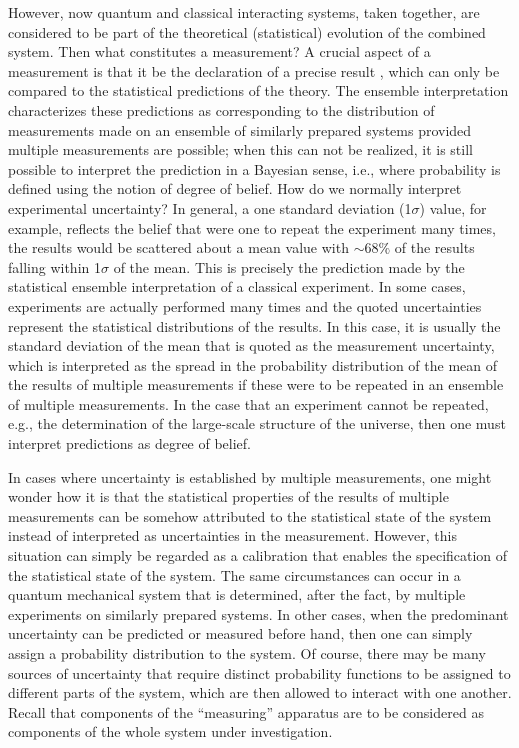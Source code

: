 \documentclass [12pt]{revtex4}
\begin{document}
However, now quantum and classical interacting systems, taken
together, are considered to be part of the theoretical (statistical)
evolution of the combined system. Then what constitutes a
measurement? A crucial aspect of a measurement is that it
be the declaration of a {precise} result \cite{precision}, which can only be compared
to the statistical predictions of the theory.  The ensemble
interpretation characterizes these predictions as corresponding to
the distribution of measurements made on an ensemble of similarly
prepared systems provided multiple measurements are possible; when this can not be realized, it is still possible to interpret the prediction in a
Bayesian sense, i.e., where probability is defined using the notion
of degree of belief.  How do we normally interpret experimental
uncertainty? In general, a one standard
deviation (1$\sigma$) value, for example, reflects the belief that
were one to repeat the experiment many times, the results would be
scattered about a mean value with $\sim 68 \%$ of the results
falling within 1$\sigma $ of the mean. This is precisely the
prediction made by the statistical ensemble interpretation of a
classical experiment. In some cases, experiments are actually
performed many times and the quoted uncertainties represent the
statistical distributions of the {results}. In this case, it
is usually the {standard deviation of the mean} that is
quoted as the measurement uncertainty, which is interpreted as the
spread in the probability distribution of the mean of the results of
multiple measurements if these were to be repeated in an ensemble
of multiple measurements.  In the case that an experiment cannot be
repeated, e.g., the determination of the large-scale structure of the
universe, then one must interpret predictions as degree of belief.

In cases where uncertainty is established by multiple measurements,
one might wonder how it is that the statistical properties of the
{results} of multiple measurements can be somehow attributed
to the statistical state of the system instead of interpreted as
uncertainties in the measurement. However, this situation can simply
be regarded as a {calibration} that enables the specification
of the statistical state of the system. The same circumstances can
occur in a quantum mechanical system that is determined, after the
fact, by multiple experiments on similarly prepared systems. In
other cases, when the predominant uncertainty can be
predicted or measured before hand, then one can simply assign a
probability distribution to the system. Of course, there may be many
sources of uncertainty that require distinct probability functions to be
assigned to different parts of the system, which are then allowed to
interact with one another. Recall that components of the
``measuring'' apparatus are to be considered as components of the
whole system under investigation.
\end{document}
